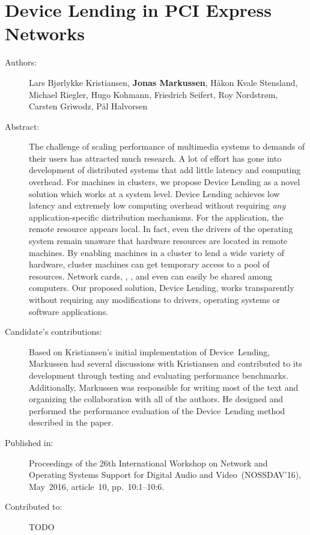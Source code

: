 \chapter{Device Lending in PCI Express Networks}
\label{paper:NOSSDAV}
\paperthumb

\begin{description}
	\item[Authors:]
		Lars Bj{\o}rlykke Kristiansen, \textbf{Jonas Markussen}, H{\aa}kon Kvale Stensland,
		Michael Riegler, Hugo Kohmann, Friedrich Seifert, Roy Nordstr{\o}m, Carsten Griwodz, P{\aa}l Halvorsen

	\item[Abstract:]
		The challenge of scaling  performance of multimedia systems to demands
		of their users has attracted much research.
		A lot of effort has gone into
		development of distributed systems that add little latency and computing overhead.
		For machines in  clusters,
		we propose Device Lending as a novel solution which works at a system
		level.
		Device Lending achieves low latency and extremely low computing overhead without
		requiring \textit{any} application-specific distribution mechanisms.
		For the application, the remote  resource appears local.
		In fact, even the drivers of the operating system remain unaware that
		hardware resources are located in remote machines.
		By enabling machines in a  cluster to lend a wide variety of hardware, 
		cluster machines can get temporary access to a pool of  resources. 
		Network cards, , , and even  can easily 
		be shared among computers.
		Our proposed solution, Device Lending, works transparently without requiring any modifications to drivers,
		operating systems or software applications.

	\item[Candidate's contributions:]
	    Based on Kristiansen's initial implementation of Device~Lending, Markussen had several discussions with Kristiansen and contributed to its development through testing and evaluating performance benchmarks.
		Additionally, Markussen was responsible for writing most of the text and organizing the collaboration with 
		all of the authors. He designed and performed the performance evaluation of the Device~Lending method described in the paper.
		

	\item[Published in:]
		Proceedings of the 26th International Workshop on Network and Operating Systems Support for Digital Audio and Video~(NOSSDAV'16),
		May~2016, article~10, pp.~10:1--10:6.

	\item[Contributed to:]
		TODO

\end{description}
